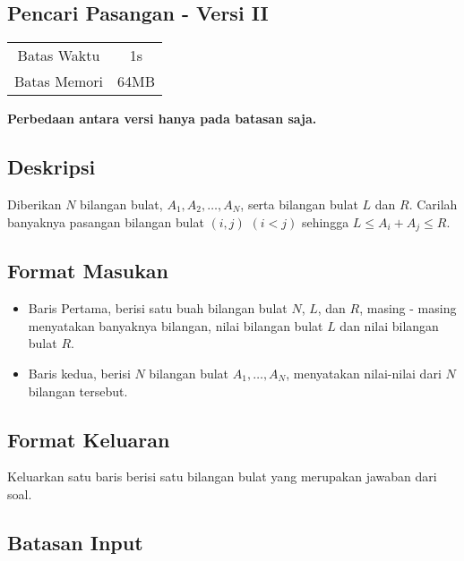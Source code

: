 \documentclass{article}
\begin{document}
\begin{center}
    \section*{Pencari Pasangan - Versi II} %

    \begin{tabular}{ | c c | }
        \hline
        Batas Waktu  & 1s \\    %
        Batas Memori & 64MB \\  %
        \hline
    \end{tabular}
\end{center}

\begin{center}
    \textbf{Perbedaan antara versi hanya pada batasan saja.}
\end{center}

\subsection*{Deskripsi}

Diberikan $N$ bilangan bulat, $A_1, A_2, \dots, A_N$, serta bilangan bulat $L$ dan $R$. Carilah banyaknya pasangan bilangan bulat $(i, j)$ $(i < j)$ sehingga $L \leq A_i + A_j \leq R$.

\subsection*{Format Masukan}
\begin{itemize}
\item{Baris Pertama, berisi satu buah bilangan bulat $N$, $L$, dan $R$, masing - masing menyatakan banyaknya bilangan, nilai bilangan bulat $L$ dan nilai bilangan bulat $R$.}

\item{Baris kedua, berisi $N$ bilangan bulat $A_1, \dots, A_N$, menyatakan nilai-nilai dari $N$ bilangan tersebut.}

\end{itemize}

\subsection*{Format Keluaran}
Keluarkan satu baris berisi satu bilangan bulat yang merupakan jawaban dari soal.

\subsection*{Batasan Input}
\end{document}
